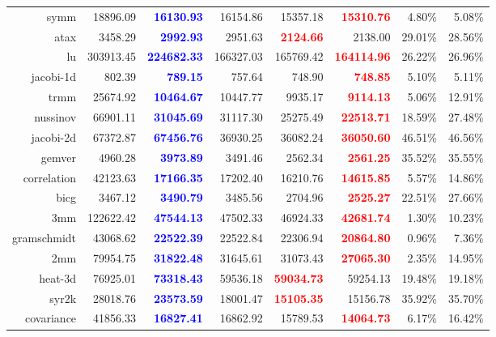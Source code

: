 \documentclass[landscape]{report}
\begin{document}
\begin{longtable}{rrrrrrrr}
symm	& 18896.09	& \textcolor{blue}{\textbf{16130.93}}	& 16154.86	& 15357.18	& \textcolor{red}{\textbf{15310.76}}	& 4.80\%	& 5.08\% \\
atax	& 3458.29	& \textcolor{blue}{\textbf{2992.93}}	& 2951.63	& \textcolor{red}{\textbf{2124.66}}	& 2138.00	& 29.01\%	& 28.56\% \\
lu	& 303913.45	& \textcolor{blue}{\textbf{224682.33}}	& 166327.03	& 165769.42	& \textcolor{red}{\textbf{164114.96}}	& 26.22\%	& 26.96\% \\
jacobi-1d	& 802.39	& \textcolor{blue}{\textbf{789.15}}	& 757.64	& 748.90	& \textcolor{red}{\textbf{748.85}}	& 5.10\%	& 5.11\% \\
trmm	& 25674.92	& \textcolor{blue}{\textbf{10464.67}}	& 10447.77	& 9935.17	& \textcolor{red}{\textbf{9114.13}}	& 5.06\%	& 12.91\% \\
nussinov	& 66901.11	& \textcolor{blue}{\textbf{31045.69}}	& 31117.30	& 25275.49	& \textcolor{red}{\textbf{22513.71}}	& 18.59\%	& 27.48\% \\
jacobi-2d	& 67372.87	& \textcolor{blue}{\textbf{67456.76}}	& 36930.25	& 36082.24	& \textcolor{red}{\textbf{36050.60}}	& 46.51\%	& 46.56\% \\
gemver	& 4960.28	& \textcolor{blue}{\textbf{3973.89}}	& 3491.46	& 2562.34	& \textcolor{red}{\textbf{2561.25}}	& 35.52\%	& 35.55\% \\
correlation	& 42123.63	& \textcolor{blue}{\textbf{17166.35}}	& 17202.40	& 16210.76	& \textcolor{red}{\textbf{14615.85}}	& 5.57\%	& 14.86\% \\
bicg	& 3467.12	& \textcolor{blue}{\textbf{3490.79}}	& 3485.56	& 2704.96	& \textcolor{red}{\textbf{2525.27}}	& 22.51\%	& 27.66\% \\
3mm	& 122622.42	& \textcolor{blue}{\textbf{47544.13}}	& 47502.33	& 46924.33	& \textcolor{red}{\textbf{42681.74}}	& 1.30\%	& 10.23\% \\
gramschmidt	& 43068.62	& \textcolor{blue}{\textbf{22522.39}}	& 22522.84	& 22306.94	& \textcolor{red}{\textbf{20864.80}}	& 0.96\%	& 7.36\% \\
2mm	& 79954.75	& \textcolor{blue}{\textbf{31822.48}}	& 31645.61	& 31073.43	& \textcolor{red}{\textbf{27065.30}}	& 2.35\%	& 14.95\% \\
heat-3d	& 76925.01	& \textcolor{blue}{\textbf{73318.43}}	& 59536.18	& \textcolor{red}{\textbf{59034.73}}	& 59254.13	& 19.48\%	& 19.18\% \\
syr2k	& 28018.76	& \textcolor{blue}{\textbf{23573.59}}	& 18001.47	& \textcolor{red}{\textbf{15105.35}}	& 15156.78	& 35.92\%	& 35.70\% \\
covariance	& 41856.33	& \textcolor{blue}{\textbf{16827.41}}	& 16862.92	& 15789.53	& \textcolor{red}{\textbf{14064.73}}	& 6.17\%	& 16.42\% \\
\bottomrule
\end{longtable}
\end{document}
